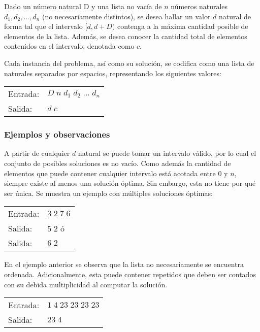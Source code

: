 Dado un número natural D y una lista no vacía de $n$ números naturales $d_1, d_2, ..., d_n$ (no necesariamente distintos), se desea hallar un valor $d$ natural de forma tal que el intervalo $[d, d + D)$ contenga a la máxima cantidad posible de elementos de la lista. Además, se desea conocer la cantidad total de elementos contenidos en el intervalo, denotada como $c$.

Cada instancia del problema, así como su solución, se codifica como una lista de naturales separados por espacios, representando los siguientes valores:

\begin{tabular}{ll}
Entrada: &$D\;n\;d_1\;d_2\;...\;d_n$ \\
Salida:  &$d\;c$
\end{tabular}

\subsubsection{Ejemplos y observaciones}

A partir de cualquier $d$ natural se puede tomar un intervalo válido, por lo cual el conjunto de posibles soluciones es no vacío. Como además la cantidad de elementos que puede contener cualquier intervalo está acotada entre $0$ y $n$, siempre existe al menos una solución óptima. Sin embargo, esta no tiene por qué ser única. Se muestra un ejemplo con múltiples soluciones óptimas:

\begin{tabular}{ll}
Entrada: &$3\;2\;7\;6$            \\
Salida:  &$5\;2$ \hspace{10mm} ó  \\
Salida:  &$6\;2$ \hspace{10mm}
\end{tabular}

En el ejemplo anterior se observa que la lista no necesariamente se encuentra ordenada. Adicionalmente, esta puede contener repetidos que deben ser contados con su debida multiplicidad al computar la solución.

\begin{tabular}{ll}
Entrada: &$1\;4\;23\;23\;23\;23$            \\
Salida:  &$23\;4$ \hspace{10mm}
\end{tabular}


